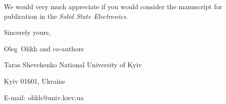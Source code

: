\documentclass[preprint]{elsarticle}
\begin{document}
We would  very much appreciate if you would consider the manuscript for publication in the \emph{Solid State Electronics}.

\vspace{3mm}

Sincerely yours,

Oleg~Olikh and co-authors


Taras Shevchenko National University of Kyiv


Kyiv 01601, Ukraine

E-mail: olikh@univ.kiev.ua


\end{document}
